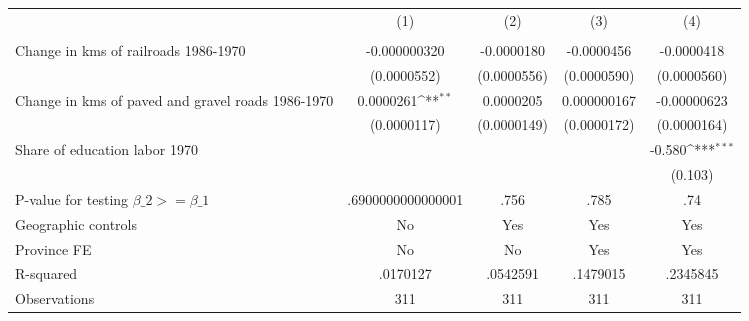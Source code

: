 {
\def\sym#1{\ifmmode^{#1}\else\(^{#1}\)\fi}
\begin{tabular}{l*{4}{c}}
\hline\hline
                &\multicolumn{1}{c}{(1)}&\multicolumn{1}{c}{(2)}&\multicolumn{1}{c}{(3)}&\multicolumn{1}{c}{(4)}\\
                &\multicolumn{1}{c}{}&\multicolumn{1}{c}{}&\multicolumn{1}{c}{}&\multicolumn{1}{c}{}\\
\hline
Change in kms of railroads 1986-1970&-0.000000320         &-0.0000180         &-0.0000456         &-0.0000418         \\
                &(0.0000552)         &(0.0000556)         &(0.0000590)         &(0.0000560)         \\
[1em]
Change in kms of paved and gravel roads 1986-1970&0.0000261\sym{**} &0.0000205         &0.000000167         &-0.00000623         \\
                &(0.0000117)         &(0.0000149)         &(0.0000172)         &(0.0000164)         \\
[1em]
Share of education labor 1970&                  &                  &                  &   -0.580\sym{***}\\
                &                  &                  &                  &  (0.103)         \\
\hline
P-value for testing $\beta\_{2} >= \beta\_{1}$&.6900000000000001         &     .756         &     .785         &      .74         \\
Geographic controls&       No         &      Yes         &      Yes         &      Yes         \\
Province FE     &       No         &       No         &      Yes         &      Yes         \\
R-squared       & .0170127         & .0542591         & .1479015         & .2345845         \\
Observations    &      311         &      311         &      311         &      311         \\
\hline\hline
\end{tabular}
}
